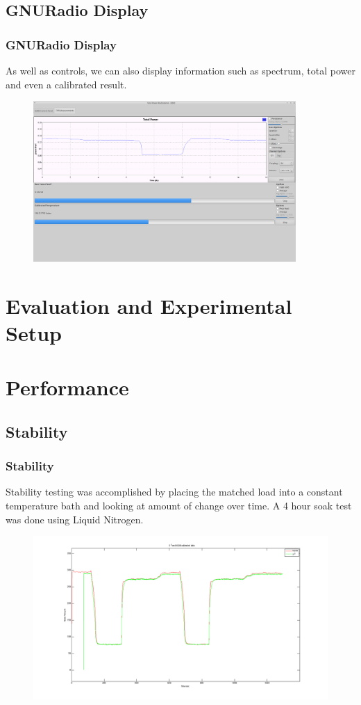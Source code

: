 \documentclass[notes]{beamer}
\begin{document}
\subsection{GNURadio Display}
\begin{frame}
\frametitle{GNURadio Display}
As well as controls, we can also display information such as spectrum, total power and even a calibrated result.
\begin{figure}\label{GNURadio_GUI}
\includegraphics[width=10cm]{images/Lab1_TPR_at_end_exp.png}
\end{figure}
\end{frame}
\section{Evaluation and Experimental Setup}
\section{Performance}
\subsection{Stability}
\begin{frame}
\frametitle{Stability}

Stability testing was accomplished by placing the matched load into a constant temperature bath and looking at amount of change over time.  A 4 hour soak test was done using Liquid Nitrogen.
\begin{figure}\label{money_shot}
\includegraphics[width=1.0\linewidth]{images/lab1_both_calib.png}
\end{figure} 
\end{frame}
\end{document}
